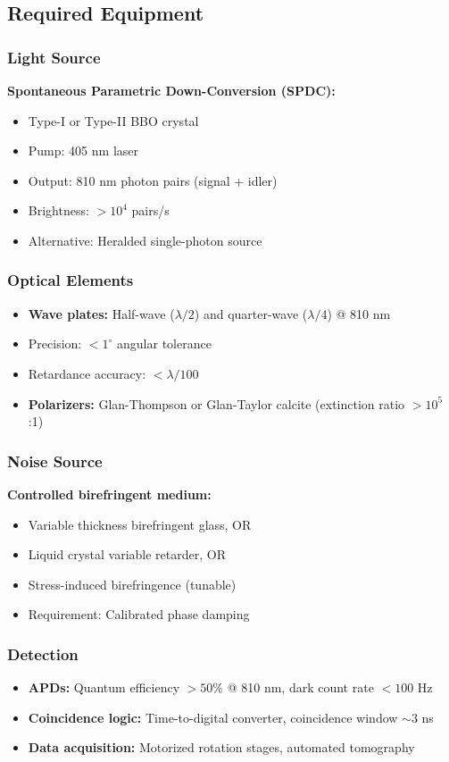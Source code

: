 \documentclass[11pt, onecolumn, letterpaper]{article}
\begin{document}
\subsection{Required Equipment}

\subsubsection{Light Source}
\textbf{Spontaneous Parametric Down-Conversion (SPDC):}
\begin{itemize}
    \item Type-I or Type-II BBO crystal
    \item Pump: 405 nm laser
    \item Output: 810 nm photon pairs (signal + idler)
    \item Brightness: $> 10^4$ pairs/s
    \item Alternative: Heralded single-photon source
\end{itemize}

\subsubsection{Optical Elements}
\begin{itemize}
    \item \textbf{Wave plates:} Half-wave ($\lambda/2$) and quarter-wave ($\lambda/4$) @ 810 nm
    \item Precision: $< 1^\circ$ angular tolerance
    \item Retardance accuracy: $< \lambda/100$
    \item \textbf{Polarizers:} Glan-Thompson or Glan-Taylor calcite (extinction ratio $> 10^5$:1)
\end{itemize}

\subsubsection{Noise Source}
\textbf{Controlled birefringent medium:}
\begin{itemize}
    \item Variable thickness birefringent glass, OR
    \item Liquid crystal variable retarder, OR
    \item Stress-induced birefringence (tunable)
    \item Requirement: Calibrated phase damping
\end{itemize}

\subsubsection{Detection}
\begin{itemize}
    \item \textbf{APDs:} Quantum efficiency $> 50\%$ @ 810 nm, dark count rate $< 100$ Hz
    \item \textbf{Coincidence logic:} Time-to-digital converter, coincidence window $\sim 3$ ns
    \item \textbf{Data acquisition:} Motorized rotation stages, automated tomography
\end{itemize}
\end{document}
